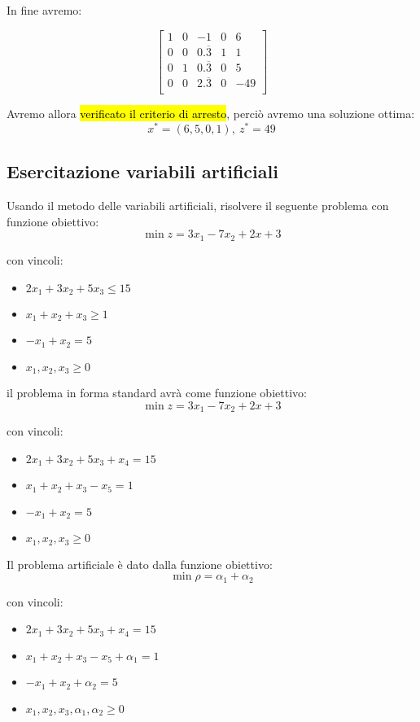 In fine avremo:


$$
\left[ {\begin{array}{ccccc}
	1 & 0 & -1 & 0 & 6\\
	0 & 0 & 0.\overline{3} & 1 & 1\\
	0 & 1 & 0.\overline{3} & 0 & 5\\
	0 & 0 & 2.\overline{3} & 0 & -49\\
\end{array} } \right]
$$

Avremo allora \hl{verificato il criterio di arresto}, perciò avremo una soluzione ottima:
$$x^* = (6, 5, 0, 1),\ z^* = 49$$


\subsection{Esercitazione variabili artificiali}

Usando il metodo delle variabili artificiali, risolvere il seguente problema con funzione obiettivo:
$$\min z = 3x_1 - 7x_2 + 2x+3$$

con vincoli:

\begin{itemize}
	\item $2x_1 + 3x_2 + 5x_3 \leq 15$
	\item $x_1 + x_2 + x_3 \geq 1$
	\item $-x_1 + x_2 = 5$
	\item $x_1, x_2, x_3 \geq 0$
\end{itemize}

il problema in forma standard avrà come funzione obiettivo:
$$\min z = 3x_1 - 7x_2 + 2x+3$$

con vincoli:

\begin{itemize}
	\item $2x_1 + 3x_2 + 5x_3 + x_4 = 15$
	\item $x_1 + x_2 + x_3 - x_5 = 1$
	\item $-x_1 + x_2 = 5$
	\item $x_1, x_2, x_3 \geq 0$
\end{itemize}

Il problema artificiale è dato dalla funzione obiettivo:
$$\min \rho = \alpha_1 + \alpha_2$$

con vincoli:

\begin{itemize}
	\item $2x_1 + 3x_2 + 5x_3 + x_4 = 15$
	\item $x_1 + x_2 + x_3 - x_5 + \alpha_1 = 1$
	\item $-x_1 + x_2 + \alpha_2 = 5$
	\item $x_1, x_2, x_3, \alpha_1, \alpha_2 \geq 0$
\end{itemize}

